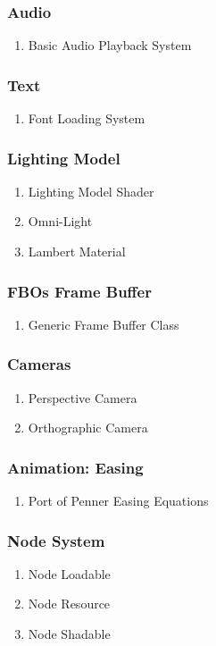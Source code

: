 \subsubsection{Audio}
\begin{enumerate}
\item Basic Audio Playback System
\end{enumerate}
\subsubsection{Text}
\begin{enumerate}
\item Font Loading System
\end{enumerate}
\subsubsection{Lighting Model}
\begin{enumerate}
\item Lighting Model Shader
\item Omni-Light
\item Lambert Material
\end{enumerate}
\subsubsection{FBOs Frame Buffer}
\begin{enumerate}
\item Generic Frame Buffer Class
\end{enumerate}
\subsubsection{Cameras}
\begin{enumerate}
\item Perspective Camera
\item Orthographic Camera
\end{enumerate}
\subsubsection{Animation: Easing}
\begin{enumerate}
\item Port of Penner Easing Equations
\end{enumerate}
\subsubsection{Node System}
\begin{enumerate}
\item Node Loadable
\item Node Resource
\item Node Shadable 
\end{enumerate}
